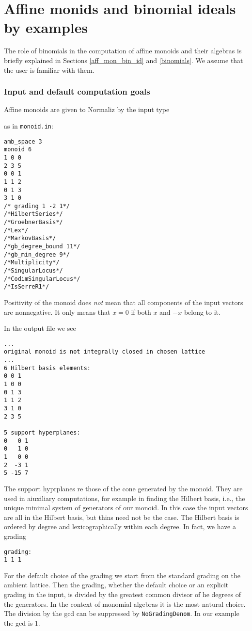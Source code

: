 \section{Affine monids and binomial ideals by examples}\label{AffMon}

The role of binomials in the computation of affine monoids and their algebras is briefly explained in Sections \ref{aff_mon_bin_id} and \ref{binomials}. We assume that the user is familiar with them.

\subsubsection{Input and default computation goals}
Affine monoids are given to Normaliz by the input type 
\begin{itemize}
	\itemtt[monoid]
\end{itemize}
as in \verb|monoid.in|:
\begin{Verbatim}
amb_space 3
monoid 6
1 0 0
2 3 5
0 0 1
1 1 2
0 1 3
3 1 0
/* grading 1 -2 1*/
/*HilbertSeries*/
/*GroebnerBasis*/
/*Lex*/
/*MarkovBasis*/
/*gb_degree_bound 11*/
/*gb_min_degree 9*/
/*Multiplicity*/
/*SingularLocus*/
/*CodimSingularLocus*/
/*IsSerreR1*/
\end{Verbatim}
Positivity of the monoid does \emph{not} mean that all components of the input vectors are nonnegative. It only means that $x=0$ if both $x$ and $-x$ belong to it.

In the output file we see
\begin{Verbatim}
...
original monoid is not integrally closed in chosen lattice
...
6 Hilbert basis elements:
0 0 1
1 0 0
0 1 3
1 1 2
3 1 0
2 3 5

5 support hyperplanes:
0   0 1
0   1 0
1   0 0
2  -3 1
5 -15 7
\end{Verbatim}
The support hyprplanes re those of the cone generated by the monoid. They are used in aiuxiliary computations, for example in finding the Hilbert basis, i.e., the unique minimal system of generators of our monoid. In this case the input vectors are all in the Hilbert basis, but thins need not be the case. The Hilbert basis is ordered by degree and lexicographically within each degree. In fact, we have a grading
\begin{Verbatim}
grading:
1 1 1 
\end{Verbatim}
For the default choice of the grading we start from the standard grading on the ambient lattice. Then the grading, whether the default choice or an explicit grading in the input, is divided by the greatest common divisor of he degrees of the generators. In the context of monomial algebras it is the most natural choice. The division by the gcd can be suppressed by \verb|NoGradingDenom|. In our example the gcd is $1$.

